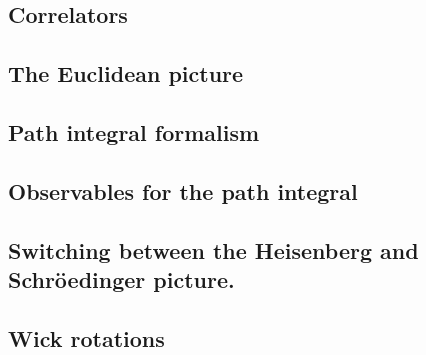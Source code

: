 \subsection{Correlators}

\subsection{The Euclidean picture}

\subsection{Path integral formalism}

\subsection{Observables for the path integral}

\subsection{Switching between the Heisenberg and Schröedinger picture.}

\subsection{Wick rotations}




